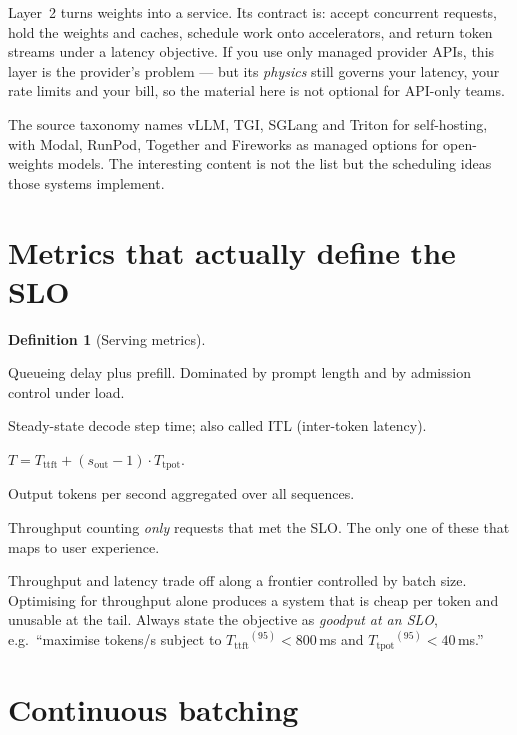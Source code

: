 \documentclass[11pt,twoside,openright]{book}
\theoremstyle{definition}
\newtheorem{definition}{Definition}[chapter]
\theoremstyle{plain}
\theoremstyle{remark}
\newcommand{\ttft}{\ensuremath{T_{\mathrm{ttft}}}}
\newcommand{\tpot}{\ensuremath{T_{\mathrm{tpot}}}}
\begin{document}
Layer~2 turns weights into a service. Its contract is: accept concurrent
requests, hold the weights and caches, schedule work onto accelerators, and
return token streams under a latency objective. If you use only managed
provider APIs, this layer is the provider's problem --- but its \emph{physics}
still governs your latency, your rate limits and your bill, so the material here
is not optional for API-only teams.

The source taxonomy names vLLM, TGI, SGLang and Triton for self-hosting, with
Modal, RunPod, Together and Fireworks as managed options for open-weights
models. The interesting content is not the list but the scheduling ideas those
systems implement.

\section{Metrics that actually define the SLO}

\begin{definition}[Serving metrics]
\begin{description}[leftmargin=2.4em,style=nextline,itemsep=1pt]
  \item[\ttft{} --- time to first token] Queueing delay plus prefill. Dominated by
        prompt length and by admission control under load.
  \item[\tpot{} --- time per output token] Steady-state decode step time; also
        called ITL (inter-token latency).
  \item[End-to-end] $T = \ttft + (s_{\text{out}}-1)\cdot \tpot$.
  \item[Throughput] Output tokens per second aggregated over all sequences.
  \item[Goodput] Throughput counting \emph{only} requests that met the SLO. The
        only one of these that maps to user experience.
\end{description}
\end{definition}

\begin{keyidea}
Throughput and latency trade off along a frontier controlled by batch size.
Optimising for throughput alone produces a system that is cheap per token and
unusable at the tail. Always state the objective as \emph{goodput at an SLO},
e.g.\ ``maximise tokens/s subject to $\ttft^{(95)} < 800$\,ms and
$\tpot^{(95)} < 40$\,ms.''
\end{keyidea}

\section{Continuous batching}
\end{document}
